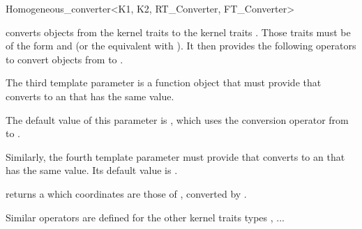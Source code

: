 \begin{ccRefClass}{Homogeneous_converter<K1, K2, RT_Converter, FT_Converter>}

\KernelRefLayout\gdef\ccTagOperatorLayout{\ccFalse}

\ccDefinition

\ccClassTemplateName converts objects from the kernel traits  to
the kernel traits .  Those traits must be of the form
 and  (or the equivalent with
).  It then provides the following operators to
convert objects from  to .

The third template parameter  is a function object that must
provide  that 
converts  to an  that has the same value.

The default value of this parameter is ,
which uses the conversion operator from
 to .

Similarly, the fourth template parameter must provide
 that
converts  to an  that has the same value.  Its
default value is  .


\ccCreation
{}


\ccOperations

{ returns a  which coordinates are those of ,
converted by .}

Similar operators are defined for the other kernel traits types ,
...

\ccSeeAlso
{} \\
 \\

\end{ccRefClass}

